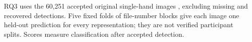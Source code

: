 RQ3 uses the 60,251 accepted original single-hand images \citep{ton-asl_alphabet}, excluding missing and recovered detections. Five fixed folds of file-number blocks give each image one held-out prediction for every representation; they are not verified participant splits. Scores measure classification after accepted detection.
